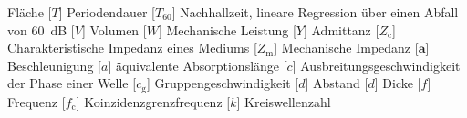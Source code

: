 \begin{acronym}[-------------------]
{		Fläche
	} %
		[$T$]				{\acrounit{\s}
		Periodendauer
	} %
		[$T_{60}$]			{\acrounit{\s}
		Nachhallzeit, lineare Regression über einen Abfall von
		\SI{60}{\dB}
	} %
		[$V$]				{\acrounit{\m\cubed}
		Volumen
	} %
		[$W$]				{\acrounit{\watt}
		Mechanische Leistung
	} %
		[$Y$]				{\acrounit{\m\per\newton\s}
		Admittanz
	}
	   [$Z_{\mathrm{c}}$] 	{\acrounit{\pascal\s\per\m}
		Charakteristische Impedanz eines Mediums 
	} %
	   [$Z_{\mathrm{m}}$] 	{\acrounit{\newton\s\per\m}
		Mechanische Impedanz
	} %
	\bigskip 	%
		[$\mathbf{a}$]		{\acrounit{\m\per\s\squared}
		Beschleunigung
	} %
		[$a$]				{\acrounit{\si{\m}}
		äquivalente Absorptionslänge
	}
		[$c$]				{\acrounit{\m\per\s}
		Ausbreitungsgeschwindigkeit der Phase einer Welle
	} %
		[$c_{\mathrm{g}}$]	{\acrounit{\m\per\s}
		Gruppengeschwindigkeit
	} %
		[$d$]				{\acrounit{\m}
		Abstand
	} %
		[$d$]				{\acrounit{\m}
		Dicke
	} %
		[$f$]				{\acrounit{\Hz}
		Frequenz
	} %
		[$f_{\mathrm{c}}$] 	{\acrounit{\Hz}
		Koinzidenzgrenzfrequenz
	}
		[$k$]				{\acrounit{\radian\per\m}
		Kreiswellenzahl
}
\end{acronym}
